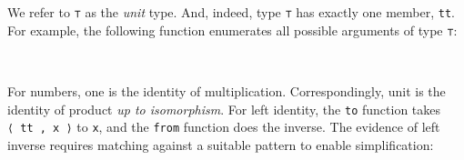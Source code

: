 We refer to \texttt{⊤} as the \emph{unit} type. And, indeed, type
\texttt{⊤} has exactly one member, \texttt{tt}. For example, the
following function enumerates all possible arguments of type \texttt{⊤}:

\begin{fence}
\begin{code}%
\>[0]\AgdaSpace{}%
\AgdaSymbol{:}\AgdaSpace{}%
\AgdaSpace{}%
\AgdaSpace{}%
\<%
\\
\>[0]\AgdaSpace{}%
\AgdaSpace{}%
\AgdaSymbol{=}\AgdaSpace{}%
\<%
\end{code}
\end{fence}

For numbers, one is the identity of multiplication. Correspondingly,
unit is the identity of product \emph{up to isomorphism}. For left
identity, the \texttt{to} function takes \texttt{⟨\ tt\ ,\ x\ ⟩} to
\texttt{x}, and the \texttt{from} function does the inverse. The
evidence of left inverse requires matching against a suitable pattern to
enable simplification:

